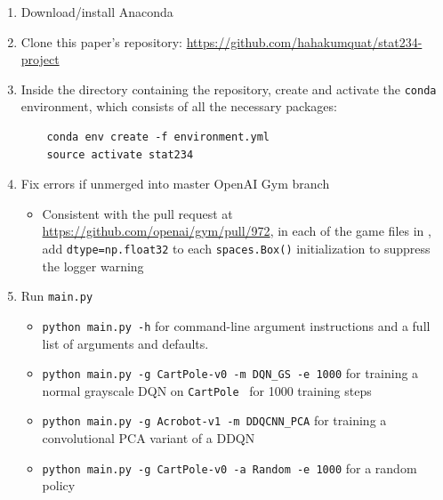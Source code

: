\documentclass[11pt]{article}
\newcommand{\cp}{\texttt{CartPole}}
\begin{document}
\begin{enumerate}
    \item Download/install Anaconda
    
    \item Clone this paper's repository: \url{https://github.com/hahakumquat/stat234-project}
    
    \item Inside the directory containing the repository, create and activate the \texttt{conda} environment, which consists of all the necessary packages: 
    
    \begin{verbatim}
    conda env create -f environment.yml
    source activate stat234
    \end{verbatim}

    \item Fix errors if unmerged into master OpenAI Gym branch
    
    \begin{itemize}
        \item Consistent with the pull request at \url{https://github.com/openai/gym/pull/972}, in each of the game files in , add \texttt{dtype=np.float32} to each \texttt{spaces.Box()} initialization to suppress the logger warning
    \end{itemize}
    
    \item Run \texttt{main.py}
    
    \begin{itemize}
        \item \texttt{python main.py -h} for command-line argument instructions and a full list of arguments and defaults.
        \item \texttt{python main.py -g CartPole-v0 -m DQN\_GS -e 1000} for training a normal grayscale DQN on \cp~ for 1000 training steps
        \item \texttt{python main.py -g Acrobot-v1 -m DDQCNN\_PCA} for training a convolutional PCA variant of a DDQN
        \item \texttt{python main.py -g CartPole-v0 -a Random -e 1000} for a random policy
    \end{itemize}
\end{enumerate}
\end{document}
